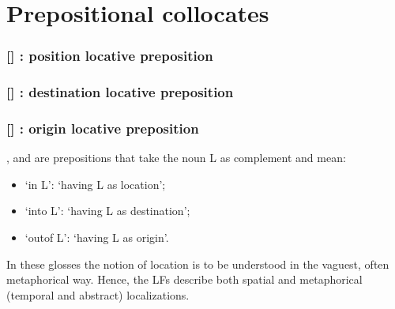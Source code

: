 \section{Prepositional collocates}\label{sec:collocatifsPrepositionnels}

\subsubsection*{{\small []}  : position locative preposition}\label{lf:Loc-in}
\vspace{-6pt}
\subsubsection*{{\small []} : destination locative preposition}\label{lf:Loc-ad}
\vspace{-6pt}
\subsubsection*{{\small []} : origin locative preposition}\label{lf:Loc-ab}

,  and  are prepositions that take the noun L as complement and mean:

\begin{itemize}

\item {} `in L': `having L as location';
\item {} `into L': `having L as destination';
\item {} `out\onewdf{}of L': `having L as origin'.

\end{itemize}

In these glosses the notion of location is to be understood in the vaguest, often metaphorical way. Hence, the LFs  describe both spatial and metaphorical (temporal and abstract) localizations.

